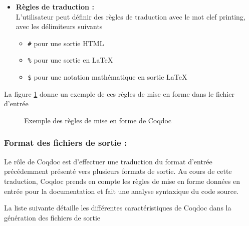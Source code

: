 \documentclass[a4paper, 11pt]{report}
\begin{document}
\begin{itemize}
        (ou afficher) des portions de code avec les délimitant avec
        \texttt{(* begin hide *)} et \texttt{(* end hide *)}
        (pour forcer l'affichage, il suffit de remplacer \texttt{hide} par \texttt{show})
      \item[] \textbf{Règles de traduction :} \\
        L'utilisateur peut définir des règles de traduction avec le mot clef
        printing, avec les délimiteurs suivants
        \begin{itemize}
          \item \texttt{\#} pour une sortie HTML
          \item \texttt{\%} pour une sortie en LaTeX
          \item \texttt{\$} pour une notation mathématique en sortie LaTeX
        \end{itemize}
    \end{itemize}
    La figure \ref{source2} donne un exemple de ces règles de mise en forme
    dans le fichier d'entrée
    \begin{figure}
      
      \caption{Exemple des règles de mise en forme de Coqdoc}
      \label{source2}
    \end{figure}

    \subsubsection{Format des fichiers de sortie :}
    Le rôle de Coqdoc est d'effectuer une traduction du format d'entrée
    précédemment présenté vers plusieurs formats de sortie. Au cours
    de cette traduction, Coqdoc prends en compte les règles de mise en forme
    données en entrée pour la documentation et fait une analyse syntaxique du
    code source.

    La liste suivante détaille les différentes caractéristiques de Coqdoc dans
    la génération des fichiers de sortie
\end{document}
